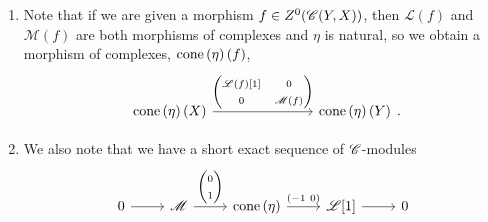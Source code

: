 \documentclass[dissertation.tex]{subfiles}
\begin{document}
        \begin{rmk}
          \begin{enumerate}
          \item
            Note that if we are given a morphism $f \in Z^0(\mathscr{C}(Y,X))$, then $\mathscr{L}(f)$ and $\mathscr{M}(f)$ are both morphisms of complexes and $\eta$ is natural, so we obtain a morphism of complexes, $\operatorname{cone}\left(\eta\right)(f)$,
            $$\begin{tikzcd}[ampersand replacement=\&]
              \cone{\eta}(X) \arrow{rrr}{\left(\begin{matrix}\mathscr{L}(f)[1] & 0\\0 & \mathscr{M}(f)\end{matrix}\right)} \&\&\& \cone{\eta}(Y)
            \end{tikzcd}.$$
          \item
            We also note that we have a short exact sequence of $\mathscr{C}$-modules
            $$\begin{tikzcd}
              0 \arrow{r} & \mathscr{M} \arrow{r}{\left(\begin{matrix}0\\1\end{matrix}\right)} & \cone{\eta} \arrow{r}{\left(-1\ 0\right)} & \mathscr{L}[1] \arrow{r} & 0
            \end{tikzcd}$$
          \end{enumerate}
        \end{rmk}
\end{document}
